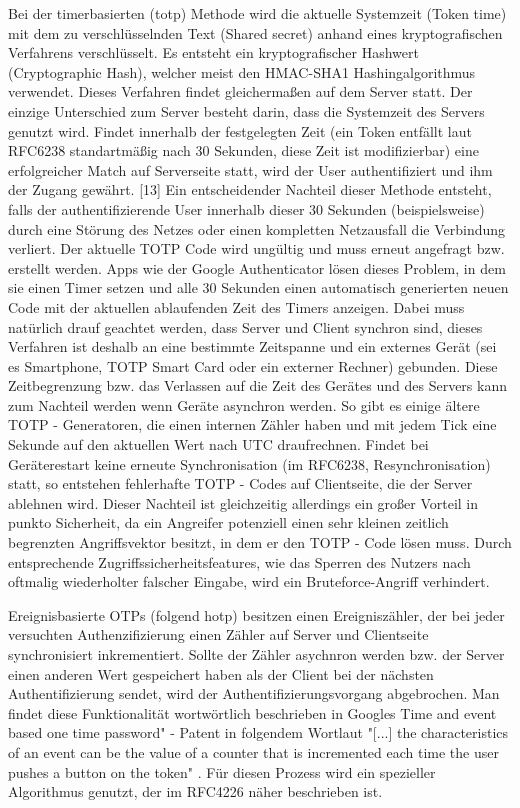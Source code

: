 Bei der timerbasierten (\ac{totp}) Methode wird die aktuelle Systemzeit (Token time) mit dem zu verschlüsselnden Text (Shared secret) anhand eines kryptografischen Verfahrens verschlüsselt. Es entsteht ein kryptografischer Hashwert (Cryptographic Hash), welcher meist den HMAC-SHA1 Hashingalgorithmus verwendet. Dieses Verfahren findet gleichermaßen auf dem Server statt. Der einzige Unterschied zum Server besteht darin, dass die Systemzeit des Servers genutzt wird. Findet innerhalb der festgelegten Zeit (ein Token entfällt laut RFC6238 standartmäßig nach 30 Sekunden, diese Zeit ist modifizierbar) eine erfolgreicher Match auf Serverseite statt, wird der User authentifiziert und ihm der Zugang gewährt. [13] Ein entscheidender Nachteil dieser Methode entsteht, falls der authentifizierende User innerhalb dieser 30 Sekunden (beispielsweise) durch eine Störung des Netzes oder einen kompletten Netzausfall die Verbindung verliert. Der aktuelle TOTP Code wird ungültig und muss erneut angefragt bzw. erstellt werden. Apps wie der Google Authenticator lösen dieses Problem, in dem sie einen Timer setzen und alle 30 Sekunden einen automatisch generierten neuen Code mit der aktuellen ablaufenden Zeit des Timers anzeigen. Dabei muss natürlich drauf geachtet werden, dass Server und Client synchron sind, dieses Verfahren ist deshalb an eine bestimmte Zeitspanne und ein externes Gerät (sei es Smartphone, TOTP Smart Card oder ein externer Rechner) gebunden. Diese Zeitbegrenzung bzw. das Verlassen auf die Zeit des Gerätes und des Servers kann zum Nachteil werden wenn Geräte asynchron werden. So gibt es einige ältere TOTP - Generatoren, die einen internen Zähler haben und mit jedem Tick eine Sekunde auf den aktuellen Wert nach UTC draufrechnen. Findet bei Geräterestart keine erneute Synchronisation (im RFC6238, Resynchronisation) statt, so entstehen fehlerhafte TOTP - Codes auf Clientseite, die der Server ablehnen wird. Dieser Nachteil ist gleichzeitig allerdings ein großer Vorteil in punkto Sicherheit, da ein Angreifer potenziell einen sehr kleinen zeitlich begrenzten Angriffsvektor besitzt, in dem er den TOTP - Code lösen muss. Durch entsprechende Zugriffssicherheitsfeatures, wie das Sperren des Nutzers nach oftmalig wiederholter falscher Eingabe, wird ein Bruteforce-Angriff verhindert.

Ereignisbasierte OTPs (folgend \ac{hotp}) besitzen einen Ereigniszähler, der bei jeder versuchten Authenzifizierung einen Zähler auf Server und Clientseite synchronisiert inkrementiert. Sollte der Zähler asychnron werden bzw. der Server einen anderen Wert gespeichert haben als der Client bei der nächsten Authentifizierung sendet, wird der Authentifizierungsvorgang abgebrochen. Man findet diese Funktionalität wortwörtlich beschrieben in Googles Time and event based one time password" - Patent \cite{A6} in folgendem Wortlaut "[...] the characteristics of an event can be the value of a counter that is incremented each time the user pushes a button on the token" \cite{A6}. Für diesen Prozess wird ein spezieller Algorithmus genutzt, der im RFC4226 näher beschrieben ist.

